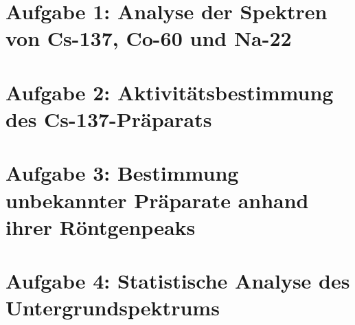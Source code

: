 \documentclass{include/protokollclass}
\begin{document}
\FrontMatter


\begingroup \let\clearpage\relax    %
\tableofcontents                    %
\listoffigures
\listoftables
\endgroup



\MainMatter
\chapter{Aufgabe 1: Analyse der Spektren von Cs-137, Co-60 und Na-22}
\chapter{Aufgabe 2: Aktivitätsbestimmung des Cs-137-Präparats}

\chapter{Aufgabe 3: Bestimmung unbekannter Präparate anhand ihrer Röntgenpeaks}

\chapter{Aufgabe 4: Statistische Analyse des Untergrundspektrums}





%
%

\end{document}
